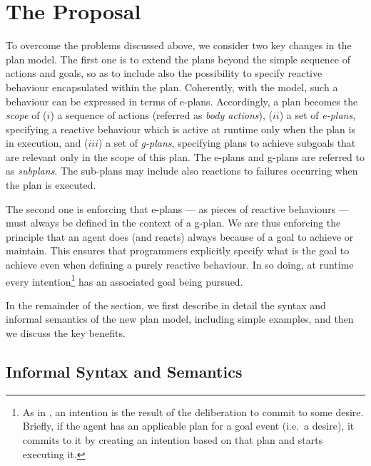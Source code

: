 \section{The {\aser} Proposal}
\label{sec:proposal}

To overcome the problems discussed above, we consider two key changes
in the plan model.
%
The first one is to extend the plans beyond the simple sequence of
actions and goals, so as to include also the possibility to specify
reactive behaviour encapsulated within the plan.
%
Coherently, with the {\asl} model, such a behaviour can be expressed
in terms of e-plans.
%
Accordingly, a plan becomes the \emph{scope} of ($i$) a sequence of
actions (referred as \emph{body actions}), ($ii$) a set of
\emph{e-plans}, specifying a reactive behaviour which is active at
runtime only when the plan is in execution, and ($iii$) a set of
\emph{g-plans}, specifying plans to achieve subgoals that are relevant
only in the scope of this plan. The e-plans and g-plans are referred
to as \emph{subplans}.
%
The sub-plans may include also reactions to failures occurring when
the plan is executed.

%
%
%
The second one is enforcing that e-plans --- as pieces of reactive
behaviours --- must always be defined in the context of a g-plan. We
are thus enforcing the principle that an agent does (and reacts)
always because of a goal to achieve or maintain.
%
This ensures that programmers explicitly specify what is the goal to
achieve even when defining a purely reactive behaviour.
%
In so doing, at runtime every intention\footnote{As in \asl, an
  intention is the result of the deliberation to commit to some
  desire. Briefly, if the agent has an applicable plan for a goal
  event (i.e.\ a desire), it commits to it by creating an intention
  based on that plan and starts executing it.} has an
associated goal being pursued.
%

In the remainder of the section, we first describe in detail the
syntax and informal semantics of the new plan model, including simple
examples, and then we discuss the key benefits.

\subsection{Informal Syntax and Semantics}

